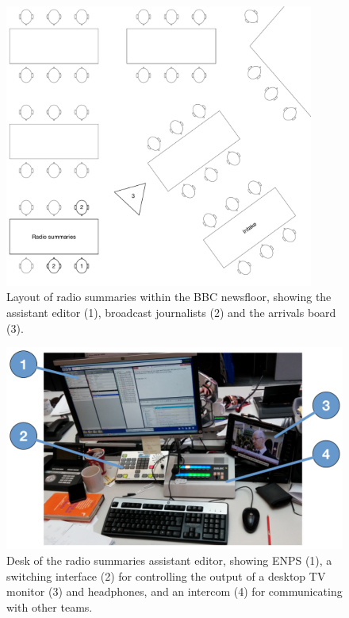 \begin{figure}
	\centering
	\includegraphics[width=4in]{figs/news-layout.pdf}
  \caption{Layout of radio summaries within the BBC newsfloor, showing the assistant editor (1), broadcast journalists
  (2) and the arrivals board (3).}
	\label{fig:newsroom-layout}
\end{figure}

\begin{figure}
  \centering
  \includegraphics[width=\columnwidth]{figs/news-desk-labelled.pdf}
  \caption{Desk of the radio summaries assistant editor, showing ENPS (1), a switching interface (2) for controlling
  the output of a desktop TV monitor (3) and headphones, and an intercom (4) for communicating with other teams.}
  \label{fig:news-desktop}
\end{figure}

